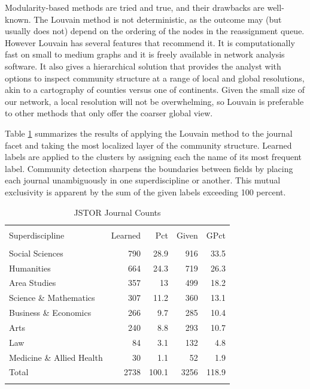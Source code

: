 \documentclass[]{book}
\theoremstyle{definition}
\theoremstyle{definition}
\theoremstyle{definition}
\theoremstyle{remark}
\begin{document}
Modularity-based methods are tried and true, and their drawbacks are
well-known. The Louvain method is not deterministic, as the outcome may
(but usually does not) depend on the ordering of the nodes in the
reassignment queue. However Louvain has several features that recommend
it. It is computationally fast on small to medium graphs and it is
freely available in network analysis software. It also gives a
hierarchical solution that provides the analyst with options to inspect
community structure at a range of local and global resolutions, akin to
a cartography of counties versus one of continents. Given the small size
of our network, a local resolution will not be overwhelming, so Louvain
is preferable to other methods that only offer the coarser global view.

Table \ref{tab:jclu-tab-sup} summarizes the results of applying the
Louvain method to the journal facet and taking the most localized layer
of the community structure. Learned labels are applied to the clusters
by assigning each the name of its most frequent label. Community
detection sharpens the boundaries between fields by placing each journal
unambiguously in one superdiscipline or another. This mutual exclusivity
is apparent by the sum of the given labels exceeding 100 percent.

\begin{table}[!htbp] \centering 
  \caption{JSTOR Journal Counts} 
  \label{tab:jclu-tab-sup} 
\begin{tabular}{@{\extracolsep{5pt}} lrrrr} 
\\[-1.8ex]\hline 
\hline \\[-1.8ex] 
Superdiscipline & Learned & Pct & Given & GPct \\ 
\hline \\[-1.8ex] 
Social Sciences & 790 & 28.9 & 916 & 33.5 \\ 
Humanities & 664 & 24.3 & 719 & 26.3 \\ 
Area Studies & 357 & 13 & 499 & 18.2 \\ 
Science \& Mathematics & 307 & 11.2 & 360 & 13.1 \\ 
Business \& Economics & 266 & 9.7 & 285 & 10.4 \\ 
Arts & 240 & 8.8 & 293 & 10.7 \\ 
Law & 84 & 3.1 & 132 & 4.8 \\ 
Medicine \& Allied Health & 30 & 1.1 & 52 & 1.9 \\ 
Total & 2738 & 100.1 & 3256 & 118.9 \\ 
\hline \\[-1.8ex] 
\end{tabular} 
\end{table}
\end{document}
